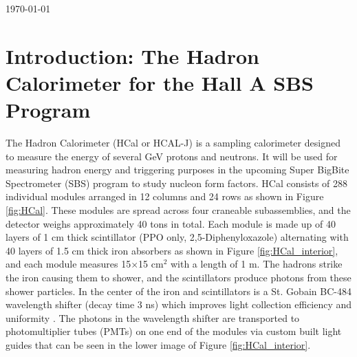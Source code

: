 \documentclass[oneside]{book}   %
\begin{document}
\begin{titlepage}
	\vfill\vfill\vfill %
	
	{\large\today} %
	
	
	 
	
	\vfill %
	
\end{titlepage}

\tableofcontents
 
\mainmatter
 
\chapter{Introduction: The Hadron Calorimeter for the Hall A SBS Program}

The Hadron Calorimeter (HCal or HCAL-J) is a sampling calorimeter designed to measure the energy of several GeV protons and neutrons. It will be used for measuring hadron energy and triggering purposes in the upcoming Super BigBite Spectrometer (SBS) program to study nucleon form factors. HCal consists of 288 individual modules arranged in 12 columns and 24 rows as shown in Figure \ref{fig:HCal}. These modules are spread across four craneable subassemblies, and the detector weighs approximately 40 tons in total. Each module is made up of 40 layers of 1 cm thick scintillator (PPO only, 2,5-Diphenyloxazole) alternating with 40 layers of 1.5 cm thick iron absorbers as shown in Figure \ref{fig:HCal_interior}, and each module measures 15$\times$15 cm$^2$ with a length of 1 m. The hadrons strike the iron causing them to shower, and the scintillators produce photons from these shower particles. In the center of the iron and scintillators is a St. Gobain BC-484 wavelength shifter (decay time 3 ns) which improves light collection efficiency and uniformity \cite{brio_2018}. The photons in the wavelength shifter are transported to photomultiplier tubes (PMTs) on one end of the modules via custom built light guides that can be seen in the lower image of Figure \ref{fig:HCal_interior}.\\
\end{document}

